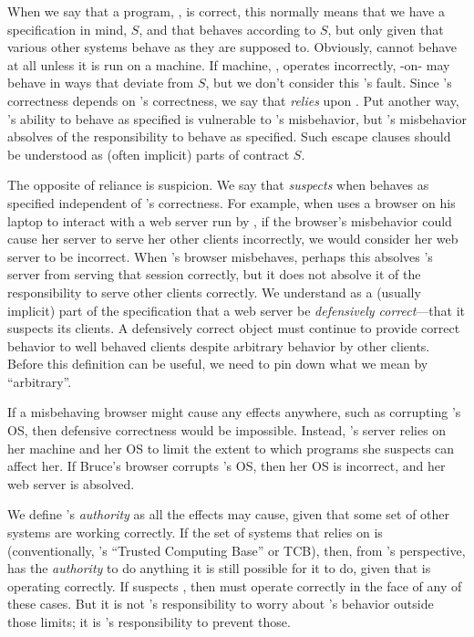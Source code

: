 \documentclass{llncs}
\begin{document}
When we say that a program, , is correct, this normally means
that we have a specification in mind, $S$, and that  behaves
according to $S$, but only given that various other systems behave as
they are supposed to. Obviously,  cannot behave at all unless
it is run on a machine. If machine, , operates incorrectly,
-on- may behave in ways that deviate from $S$, but we
don't consider this 's fault. Since 's correctness
depends on 's correctness, we say that  \emph{relies}
upon . Put another way, 's ability to behave as
specified is vulnerable to 's misbehavior, but 's
misbehavior absolves  of the responsibility to behave as
specified. Such escape clauses should be understood as (often
implicit) parts of contract $S$.

The opposite of reliance is suspicion. We say that 
\emph{suspects}  when  behaves as specified
independent of 's correctness. For example, when 
uses a browser on his laptop to interact with a web server run by
, if the browser's misbehavior could cause her server to
serve her other clients incorrectly, we would consider her web server
to be incorrect. When 's browser misbehaves, perhaps this
absolves 's server from serving that session correctly, but
it does not absolve it of the responsibility to serve other clients
correctly. We understand as a (usually implicit) part of the
specification that a web server be \emph{defensively correct}---that
it suspects its clients. A defensively correct object must continue to
provide correct behavior to well behaved clients despite arbitrary
behavior by other clients. Before this definition can be useful, we
need to pin down what we mean by ``arbitrary''.

If a misbehaving browser might cause any effects anywhere, such as
corrupting 's OS, then defensive correctness would be
impossible. Instead, 's server relies on her machine and her OS
to limit the extent to which programs she suspects can affect her. If
Bruce's browser corrupts 's OS, then her OS is incorrect, and her
web server is absolved.

We define 's \emph{authority} as all the effects  may
cause, given that some set of other systems are working correctly. If
the set of systems that  relies on is 
(conventionally, 's ``Trusted Computing Base'' or TCB), then,
from 's perspective,  has the \emph{authority} to do
anything it is still possible for it to do, given that  is
operating correctly. If  suspects , then  must
operate correctly in the face of any of these cases. But it is not
's responsibility to worry about 's behavior outside
those limits; it is 's responsibility to prevent those.
\end{document}
